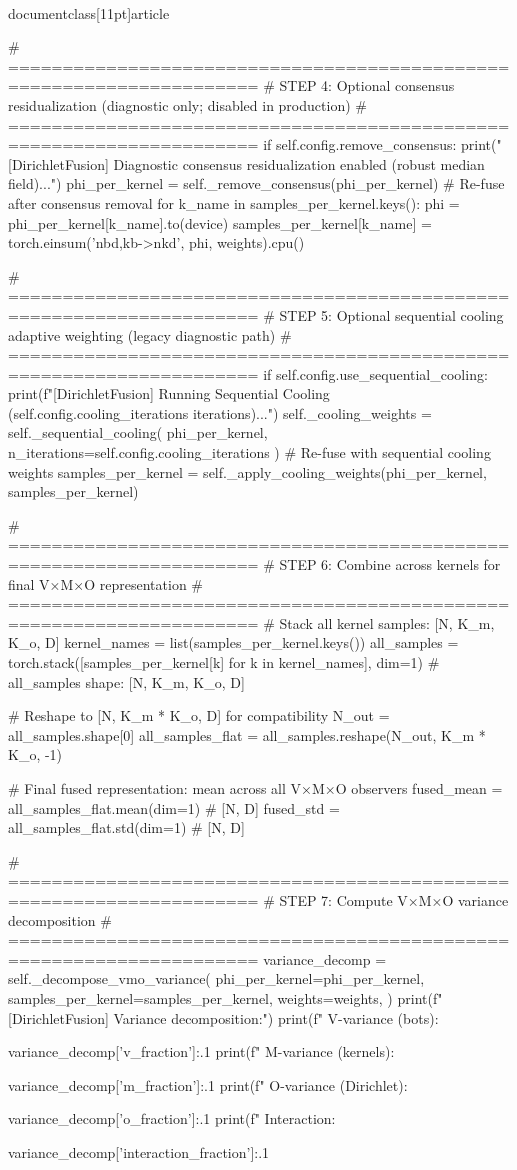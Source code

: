 \\documentclass[11pt]{article}
\begin{document}
\begin{CodeBlock}
        # =====================================================================
        # STEP 4: Optional consensus residualization (diagnostic only; disabled in production)
        # =====================================================================
        if self.config.remove_consensus:
            print("[DirichletFusion] Diagnostic consensus residualization enabled (robust median field)...")
            phi_per_kernel = self._remove_consensus(phi_per_kernel)
            # Re-fuse after consensus removal
            for k_name in samples_per_kernel.keys():
                phi = phi_per_kernel[k_name].to(device)
                samples_per_kernel[k_name] = torch.einsum('nbd,kb->nkd', phi, weights).cpu()
        
        # =====================================================================
        # STEP 5: Optional sequential cooling adaptive weighting (legacy diagnostic path)
        # =====================================================================
        if self.config.use_sequential_cooling:
            print(f"[DirichletFusion] Running Sequential Cooling ({self.config.cooling_iterations} iterations)...")
            self._cooling_weights = self._sequential_cooling(
                phi_per_kernel, 
                n_iterations=self.config.cooling_iterations
            )
            # Re-fuse with sequential cooling weights
            samples_per_kernel = self._apply_cooling_weights(phi_per_kernel, samples_per_kernel)
        
        # =====================================================================
        # STEP 6: Combine across kernels for final V×M×O representation
        # =====================================================================
        # Stack all kernel samples: [N, K_m, K_o, D]
        kernel_names = list(samples_per_kernel.keys())
        all_samples = torch.stack([samples_per_kernel[k] for k in kernel_names], dim=1)
        # all_samples shape: [N, K_m, K_o, D]
        
        # Reshape to [N, K_m * K_o, D] for compatibility
        N_out = all_samples.shape[0]
        all_samples_flat = all_samples.reshape(N_out, K_m * K_o, -1)
        
        # Final fused representation: mean across all V×M×O observers
        fused_mean = all_samples_flat.mean(dim=1)  # [N, D]
        fused_std = all_samples_flat.std(dim=1)    # [N, D]
        
        # =====================================================================
        # STEP 7: Compute V×M×O variance decomposition
        # =====================================================================
        variance_decomp = self._decompose_vmo_variance(
            phi_per_kernel=phi_per_kernel,
            samples_per_kernel=samples_per_kernel,
            weights=weights,
        )
        print(f"[DirichletFusion] Variance decomposition:")
        print(f"  V-variance (bots): {variance_decomp['v_fraction']:.1%
        print(f"  M-variance (kernels): {variance_decomp['m_fraction']:.1%
        print(f"  O-variance (Dirichlet): {variance_decomp['o_fraction']:.1%
        print(f"  Interaction: {variance_decomp['interaction_fraction']:.1%
        
}}}}
\end{CodeBlock}
\end{document}
